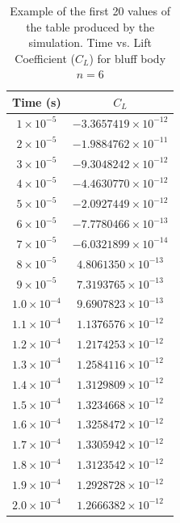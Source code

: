 \begin{table}[H]
	\centering
	\begin{tabular}{|c|c|}
		\hline
		\textbf{Time (s)} & \textbf{$C_L$} \\
		\hline
		$1 \times 10^{-5}$  & $-3.3657419 \times 10^{-12}$ \\
		\hline
		$2 \times 10^{-5}$  & $-1.9884762 \times 10^{-11}$ \\
		\hline
		$3 \times 10^{-5}$  & $-9.3048242 \times 10^{-12}$ \\
		\hline
		$4 \times 10^{-5}$  & $-4.4630770 \times 10^{-12}$ \\
		\hline
		$5 \times 10^{-5}$  & $-2.0927449 \times 10^{-12}$ \\
		\hline
		$6 \times 10^{-5}$  & $-7.7780466 \times 10^{-13}$ \\
		\hline
		$7 \times 10^{-5}$  & $-6.0321899 \times 10^{-14}$ \\
		\hline
		$8 \times 10^{-5}$  & $4.8061350 \times 10^{-13}$ \\
		\hline
		$9 \times 10^{-5}$  & $7.3193765 \times 10^{-13}$ \\
		\hline
		$1.0 \times 10^{-4}$ & $9.6907823 \times 10^{-13}$ \\
		\hline
		$1.1 \times 10^{-4}$ & $1.1376576 \times 10^{-12}$ \\
		\hline
		$1.2 \times 10^{-4}$ & $1.2174253 \times 10^{-12}$ \\
		\hline
		$1.3 \times 10^{-4}$ & $1.2584116 \times 10^{-12}$ \\
		\hline
		$1.4 \times 10^{-4}$ & $1.3129809 \times 10^{-12}$ \\
		\hline
		$1.5 \times 10^{-4}$ & $1.3234668 \times 10^{-12}$ \\
		\hline
		$1.6 \times 10^{-4}$ & $1.3258472 \times 10^{-12}$ \\
		\hline
		$1.7 \times 10^{-4}$ & $1.3305942 \times 10^{-12}$ \\
		\hline
		$1.8 \times 10^{-4}$ & $1.3123542 \times 10^{-12}$ \\
		\hline
		$1.9 \times 10^{-4}$ & $1.2928728 \times 10^{-12}$ \\
		\hline
		$2.0 \times 10^{-4}$ & $1.2666382 \times 10^{-12}$ \\
		\hline
	\end{tabular}
	\label{tab:6FaceClTable}
	\caption{Example of the first 20 values of the table produced by the simulation. Time vs. Lift Coefficient ($C_L$) for bluff body $n=6$}
\end{table}

